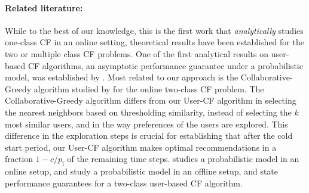 \documentclass{article}
\newcommand\pf{p_{\mathrm{f}}}
\begin{document}
\paragraph{Related literature:}
While to the best of our knowledge, this is the first work that \emph{analytically} studies one-class CF in an online setting,
theoretical results have been established for the two or multiple class CF problems. 
One of the first analytical results on user-based CF algorithms, an asymptotic performance guarantee under a probabilistic model, was established by \citet{biau_statistical_2010}. 
Most related to our approach is the Collaborative-Greedy algorithm studied by \citet{bresler_latent_2014} for the online two-class CF problem. %
The Collaborative-Greedy algorithm differs from our User-CF algorithm in selecting the nearest neighbors based on thresholding similarity, instead of selecting the $k$ most similar users, and in the way preferences of the users are explored. 
This difference in the exploration steps is crucial for establishing that after the cold start period, our User-CF algorithm makes optimal recommendations in a fraction $1 - c/\pf$ of the remaining time steps. 
\citet{dabeer_adaptive_2013} studies a probabilistic model in an online setup, and 
\citet{barman_analysis_2012} study a probabilistic model in an offline setup, and state performance guarantees for a two-class user-based CF algorithm. 
\end{document}
